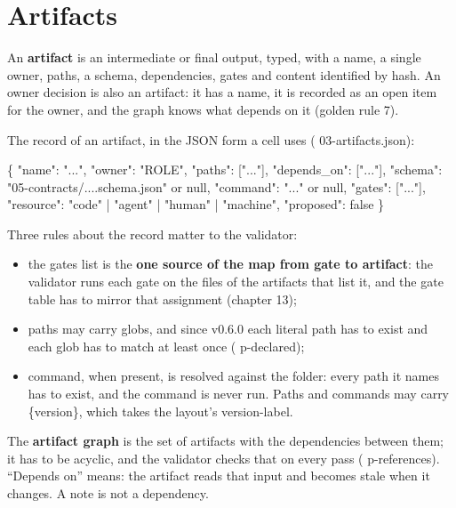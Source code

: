 \documentclass[
  american,
  10pt,
]{report}
\newenvironment{Shaded}{\begin{snugshade}}{\end{snugshade}}
\newcommand{\NormalTok}[1]{#1}
\providecommand{\tightlist}{%
  \setlength{\itemsep}{0pt}\setlength{\parskip}{0pt}}
\renewenvironment{Shaded}{%
  \def\FrameCommand{{\color{rulecolor}\vrule width 2pt}\hspace{6pt}\colorbox{shadecolor}}%
  \MakeFramed{\advance\hsize-\width\FrameRestore}\small}%
  {\endMakeFramed}
\renewcommand{\texttt}[1]{{\ttfamily\hyphenchar\font=-1 #1}}
\begin{document}
\section{Artifacts}\label{artifacts}

An \textbf{artifact} is an intermediate or final output, typed, with a
name, a single owner, paths, a schema, dependencies, gates and content
identified by hash. An owner decision is also an artifact: it has a
name, it is recorded as an open item for the owner, and the graph knows
what depends on it (golden rule 7).

The record of an artifact, in the JSON form a cell uses
(\texttt{03-\allowbreak{}artifacts.\allowbreak{}json}):

\begin{Shaded}
\begin{Highlighting}[]
\NormalTok{\{ "name": "...", "owner": "ROLE", "paths": ["..."], "depends\_on": ["..."],}
\NormalTok{  "schema": "05{-}contracts/....schema.json" or null, "command": "..." or null,}
\NormalTok{  "gates": ["..."], "resource": "code" | "agent" | "human" | "machine",}
\NormalTok{  "proposed": false \}}
\end{Highlighting}
\end{Shaded}

Three rules about the record matter to the validator:

\begin{itemize}
\tightlist
\item
  the \texttt{gates} list is the \textbf{one source of the map from gate
  to artifact}: the validator runs each gate on the files of the
  artifacts that list it, and the gate table has to mirror that
  assignment (chapter 13);
\item
  \texttt{paths} may carry globs, and since v0.6.0 each literal path has
  to exist and each glob has to match at least once
  (\texttt{p-\allowbreak{}declared});
\item
  \texttt{command}, when present, is resolved against the folder: every
  path it names has to exist, and the command is never run. Paths and
  commands may carry \texttt{\{version\}}, which takes the layout's
  \texttt{version-\allowbreak{}label}.
\end{itemize}

The \textbf{artifact graph} is the set of artifacts with the
dependencies between them; it has to be acyclic, and the validator
checks that on every pass (\texttt{p-\allowbreak{}references}).
``Depends on'' means: the artifact reads that input and becomes stale
when it changes. A note is not a dependency.
\end{document}
